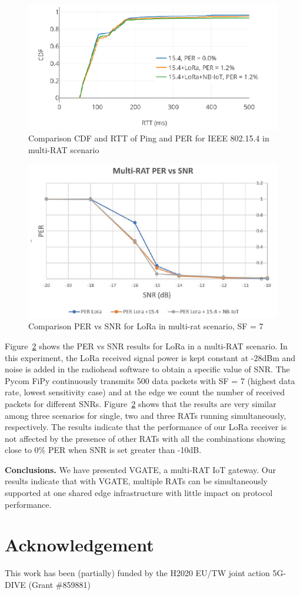 \documentclass[10pt,emptycopyrightspace]{ewsn-proc}
\newcommand{\fakepar}[1]{\noindent\textbf{#1.}}
\begin{document}
\begin{figure}[t]
  \centering
	\includegraphics[width= 0.4 \textwidth]{5-5.png}
	\caption{Comparison CDF and RTT of Ping and PER for IEEE
802.15.4 in multi-RAT scenario}
	\label{fig:5-5}
\end{figure}


\begin{figure}[t]
  \vspace{-0.3cm}
	\centering
	\includegraphics[width= 0.4 \textwidth]{5-6.png}
	\caption{Comparison PER vs SNR for LoRa in multi-rat scenario, SF = 7
}
	\label{fig:5-6}
  \vspace{-0.5cm}
\end{figure}


Figure~\ref{fig:5-6} shows the PER vs SNR results for LoRa in a
multi-RAT scenario. In this experiment, the LoRa received signal power
is kept constant at -28dBm and noise is added in the radiohead
software to obtain a specific value of
SNR. The Pycom FiPy continuously transmits 500 data packets with SF =
7 (highest data rate, lowest sensitivity case) and at the edge we count the number of received packets for
different SNRs. Figure~\ref{fig:5-6} shows that the results are very similar
among three scenarios for single, two and three RATs running
simultaneously, respectively. The results indicate that the performance of our
LoRa receiver is not affected by the presence of other RATs with all
the combinations showing close to 0\% PER when SNR is set greater than
-10dB.

\fakepar{Conclusions} We have presented VGATE, a multi-RAT IoT gateway.
Our results indicate that with VGATE, multiple RATs can be
simultaneously supported at one shared edge infrastructure
with little impact on protocol performance.

\section{Acknowledgement}
This work has been (partially) funded by the H2020 EU/TW joint
action 5G-DIVE (Grant \#859881)
\end{document}

